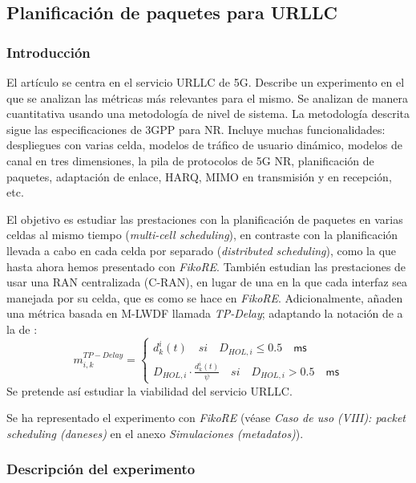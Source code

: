 \documentclass[12pt]{report} %
\begin{document}
\subsection{Planificación de paquetes para URLLC}

\subsubsection{Introducción}

El artículo \cite{RefWorks:66} se centra en el servicio URLLC de 5G.
Describe un experimento en el que se analizan las métricas más relevantes para el mismo.
Se analizan de manera cuantitativa usando una metodología de nivel de sistema.
La metodología descrita sigue las especificaciones de 3GPP para NR.
Incluye muchas funcionalidades:
despliegues con varias celda, modelos de tráfico de usuario dinámico, modelos de canal en tres dimensiones, la pila de protocolos de 5G NR, planificación de paquetes, adaptación de enlace, HARQ, MIMO en transmisión y en recepción, etc.

El objetivo es estudiar las prestaciones con la planificación de paquetes en varias celdas al mismo tiempo (\textit{multi-cell scheduling}),
en contraste con la planificación llevada a cabo en cada celda por separado (\textit{distributed scheduling}), como la que hasta ahora hemos presentado con \textit{FikoRE}.
También estudian las prestaciones de usar una RAN centralizada (C-RAN),
en lugar de una en la que cada interfaz sea manejada por su celda, que es como se hace en \textit{FikoRE}.
Adicionalmente, añaden una métrica basada en M-LWDF llamada \textit{TP-Delay};
adaptando la notación de \cite{RefWorks:66} a la de \cite{RefWorks:26}:
$$
m_{i, k}^{TP-Delay} = \left\lbrace
\begin{array}{lr}
d_{k}^i (t) \quad si \quad D_{HOL, i} \leq \mathsf{0.5 \quad ms} \\
D_{HOL, i} \cdot \frac {d_{k}^i (t)} { \psi } \quad si \quad D_{HOL, i} > \mathsf{0.5 \quad ms}
\end{array}
\right.
$$
Se pretende así estudiar la viabilidad del servicio URLLC.
\cite{RefWorks:66}

Se ha representado el experimento con \textit{FikoRE}
(véase \textit{Caso de uso (VIII): packet scheduling (daneses)} en el anexo \textit{Simulaciones (metadatos)}).

\subsubsection{Descripción del experimento}
\end{document}
